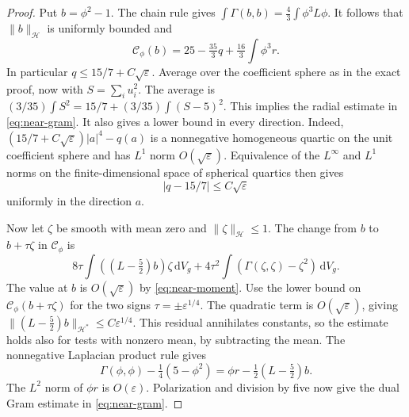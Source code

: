 \documentclass[11pt]{article}
\numberwithin{equation}{section}
\newcommand{\dd}{\mathrm{d}}
\newcommand{\e}{\varepsilon}
\newcommand{\abs}[1]{\lvert #1\rvert}
\newcommand{\norm}[1]{\lVert #1\rVert}
\newcommand{\dv}{\dd V_g}
\begin{document}
\begin{proof}
Put \(b=\phi^2-1\). The chain rule gives
\(\int\Gamma(b,b)=\frac43\int\phi^3L\phi\).
It follows that \(\norm b_{\mathcal H}\) is uniformly bounded and
\[
 \mathcal C_\phi(b)=25-\tfrac{35}{3}q+\tfrac{16}{3}\int\phi^3r .
\]
In particular \(q\le15/7+C\sqrt\e\).
Average over the coefficient sphere as in the exact proof, now
with \(S=\sum_i u_i^2\). The average is
\((3/35)\int S^2=15/7+(3/35)\int(S-5)^2\).
This implies the radial estimate in \eqref{eq:near-gram}.
It also gives a lower bound in every direction. Indeed,
\((15/7+C\sqrt\e)\abs a^4-q(a)\) is a nonnegative homogeneous
quartic on the unit coefficient sphere and has
\(L^1\) norm \(O(\sqrt\e)\). Equivalence of the \(L^\infty\) and
\(L^1\) norms on the finite-dimensional space of spherical quartics
then gives
\begin{equation}\label{eq:near-moment}
 \abs{q-15/7}\le C\sqrt\e
\end{equation}
uniformly in the direction \(a\).

Now let \(\zeta\) be smooth with mean zero and
\(\norm{\zeta}_{\mathcal H}\le1\). The change from \(b\) to
\(b+\tau\zeta\) in \(\mathcal C_\phi\) is
\[
 8\tau\int ((L-\tfrac52)b)\zeta\,\dv+
    4\tau^2\int(\Gamma(\zeta,\zeta)-\zeta^2)\,\dv .
\]
The value at \(b\) is \(O(\sqrt\e)\) by \eqref{eq:near-moment}.
Use the lower bound on \(\mathcal C_\phi(b+\tau\zeta)\) for the
two signs \(\tau=\pm\e^{1/4}\).
The quadratic term is \(O(\sqrt\e)\), giving
\(\norm{(L-\tfrac52)b}_{\mathcal H^*}\le C\e^{1/4}\).
This residual annihilates constants, so the estimate holds also
for tests with nonzero mean, by subtracting the mean.
The nonnegative Laplacian product rule gives
\[
 \Gamma(\phi,\phi)-\tfrac14(5-\phi^2)
       =\phi r-\tfrac12(L-\tfrac52)b .
\]
The \(L^2\) norm of \(\phi r\) is \(O(\e)\).
Polarization and division by five now give the dual Gram
estimate in \eqref{eq:near-gram}.


\end{proof}
\end{document}
